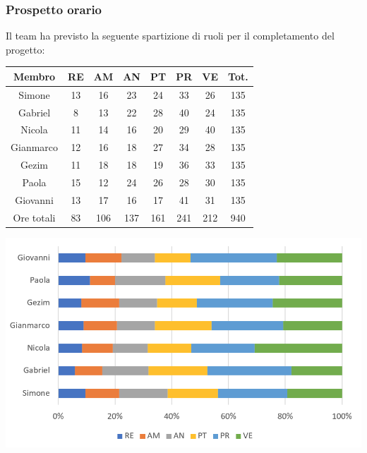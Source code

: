 \subsubsection{Prospetto orario}
Il team ha previsto la seguente spartizione di ruoli per il completamento del progetto:
\\
\begin{center}
\begin{tabular}{ |c|c|c|c|c|c|c|c|  }
 \hline
 Membro 		& RE 		& AM 		& AN 	& PT 	& PR 	& VE 	& Tot.\\
 \hline\hline
 Simone			& 13 		& 16			& 23 		& 24 		& 33 		& 26 		& 135\\
 Gabriel		& 8 			& 13 		& 22 		& 28		& 40 		& 24 		& 135\\
 Nicola			& 11 		& 14 		& 16 		& 20 		& 29 		& 40 		& 135\\
 Gianmarco		& 12 		& 16 		& 18 		& 27	 	& 34 		& 28 		& 135\\
 Gezim			& 11 		& 18 		& 18 		& 19 		& 36 		& 33	 	& 135\\
 Paola			& 15 		& 12 		& 24 		& 26 		& 28 		& 30 		& 135\\
 Giovanni		& 13 		& 17	 		& 16 		& 17 		& 41	 	& 31  		& 135\\
 \hline\hline
 Ore totali		& 83 	& 106		& 137 	& 161 	& 241 	& 212 	& 940\\
  \hline
\end{tabular}
\end{center}

\includegraphics[width=\textwidth]{res/img/hip}
\
